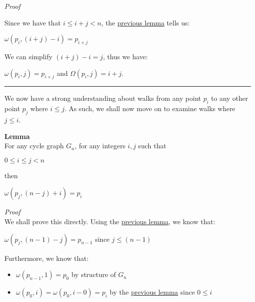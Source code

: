 \documentclass[a4paper,12pt]{article}
\begin{document}
\noindent
\textit{Proof}

\noindent Since we have that $i \leq i + j < n$, the \hyperlink{lemma:existence_of_walk_1}{previous lemma} tells us:
\begin{center}
$\omega(p_i, (i + j) - i) = p_{i+j}$
\end{center}

\noindent We can simplify $(i + j) - i = j$, thus we have:
\begin{center}
$\omega(p_i, j) = p_{i+j}$ and 
$\Omega(p_i, j) = i + j$.
\end{center}


\begin{center}
\noindent\rule{8cm}{0.4pt}
\end{center}


\noindent We now have a strong understanding about walks from any point $p_i$ to any other point $p_j$ where $i \leq j$. As such, we shall now move on to examine walks where $j \leq i$.\\



\label{lemma:existence_of_walk_2}
\hypertarget{lemma:existence_of_walk_2}{}
\begin{tcolorbox}
\textbf{Lemma}\\
For any cycle graph $G_n$, for any integers $i, j$ such that
\begin{center}
$0 \leq i \leq j < n$
\end{center}

\noindent then
\begin{center}
$\omega(p_j, (n - j) + i) = p_i$
\end{center}
\end{tcolorbox}

\noindent
\textit{Proof}\\
We shall prove this directly. Using the \hyperlink{lemma:existence_of_walk_1}{previous lemma}, we know that:
\begin{center}
$\omega(p_j, (n - 1) - j) = p_{n-1}$ since $j \leq (n - 1)$
\end{center}

Furthermore, we know that:
\begin{itemize}
\item $\omega(p_{n-1}, 1) = p_0$ by structure of $G_n$
\item $\omega(p_0, i) = \omega(p_0, i - 0) = p_i$ by the \hyperlink{lemma:existence_of_walk_1}{previous lemma} since $0 \leq i$
\end{itemize}
\end{document}
